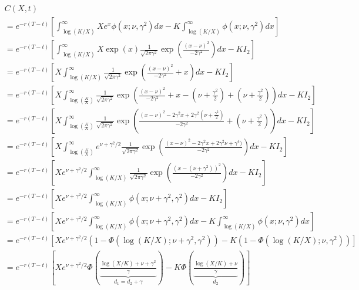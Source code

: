 \documentclass[12pt,a4paper,headsepline,bibliography=totoc,listof=totoc,headinclude=false,footinclude=false,BCOR5mm]{scrreprt} %
\begin{document}
\begin{equation} \label{feynmanbsIII}\begin{split}
&C(X,t)\\ &=e^{-r(T-t)} \left[ \int_{\log(K/X)}^{\infty} Xe^{x} \phi(x; \nu,\gamma^2)dx - K \int_{\log(K/X)}^{\infty} \phi(x; \nu,\gamma^2)dx \right] \\
&=e^{-r(T-t)} \left[ \int_{\log(K/X)}^{\infty} X\exp(x) \frac{1}{\sqrt{2 \pi \gamma^2}} \exp \left ( \frac{(x-\nu)^2}{-2 \gamma^2} \right )dx - K I_2 \right]\\
&=e^{-r(T-t)} \left[X \int_{\log(K/X)}^{\infty}  \frac{1}{\sqrt{2 \pi \gamma^2}} \exp \left ( \frac{(x-\nu)^2}{-2\gamma^2} + x\right ) dx - K I_2 \right] \\
&=e^{-r(T-t)} \left[X \int_{\log(\frac{K}{X})}^{\infty}  \frac{1}{\sqrt{2 \pi \gamma^2}} \exp \left ( \frac{(x-\nu)^2}{-2\gamma^2} + x - (\nu + \frac{\gamma^2}{2})+ (\nu + \frac{\gamma^2}{2})\right ) dx- K I_2 \right]\\
&=e^{-r(T-t)} \left[X \int_{\log(\frac{K}{X})}^{\infty}  \frac{1}{\sqrt{2 \pi \gamma^2}} \exp \left ( \frac{(x-\nu)^2 -2\gamma^2x +2\gamma^2(\nu + \frac{\gamma^2}{2})}{-2\gamma^2} + (\nu + \frac{\gamma^2}{2})\right ) dx- K  I_2 \right] \\
&=e^{-r(T-t)} \left[X \int_{\log(\frac{K}{X})}^{\infty} e^{\nu + \gamma^{2}/2} \frac{1}{\sqrt{2 \pi \gamma^2}} \exp \left ( \frac{(x-\nu)^2 -2\gamma^2x +2\gamma^2\nu + \gamma^4)}{-2\gamma^2} \right ) dx- K I_2 \right]  \\
&=e^{-r(T-t)} \left[Xe^{\nu + \gamma^{2}/2}  \int_{\log(K/X)}^{\infty} \frac{1}{\sqrt{2 \pi \gamma^2}} \exp \left ( \frac{(x-(\nu+\gamma^2))^2}{-2\gamma^2} \right ) dx- K I_2 \right] \\
&=e^{-r(T-t)} \left[Xe^{\nu + \gamma^{2}/2} \int_{\log(K/X)}^{\infty}  \phi(x; \nu+\gamma^2,\gamma^2)dx - K  I_2 \right]  \\
&=e^{-r(T-t)} \left[Xe^{\nu + \gamma^{2}/2} \int_{\log(K/X)}^{\infty}  \phi(x; \nu+\gamma^2,\gamma^2)dx - K \int_{\log(K/X)}^{\infty} \phi(x; \nu,\gamma^2)dx \right] \\
&= e^{-r(T-t)} \left[Xe^{\nu + \gamma^{2}/2}  \left (1- \Phi(\log(K/X); \nu+\gamma^2,\gamma^2) \right ) - K (1-\Phi(\log(K/X); \nu,\gamma^2))\right] \\
&= e^{-r(T-t)} \left[Xe^{\nu + \gamma^{2}/2}  \Phi(\underbrace{\frac{\log(X/K) + \nu+\gamma^2}{ \gamma}}_{d_1 = d_2 + \gamma}) - K \Phi(\underbrace{\frac{\log(X/K) + \nu}{ \gamma}}_{d_2})\right] 
\end{split}\end{equation}
\end{document}
